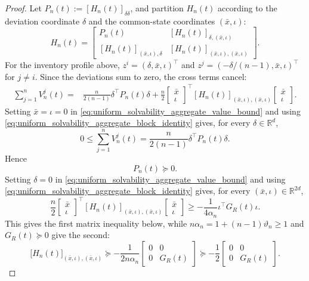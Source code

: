 \documentclass[12pt]{article}
\numberwithin{equation}{section}
\theoremstyle{definition}
\begin{document}
\begin{proof}
Let \(P_n(t):=[H_n(t)]_{\delta\delta}\), and partition \(H_n(t)\) according
to the deviation coordinate \(\delta\) and the common-state coordinates
\((\bar x,\iota)\):
\[
H_n(t)=
\begin{bmatrix}
P_n(t)&[H_n(t)]_{\delta,(\bar x,\iota)}\\
[H_n(t)]_{(\bar x,\iota),\delta}
&[H_n(t)]_{(\bar x,\iota),(\bar x,\iota)}
\end{bmatrix}.
\]
For the inventory profile above,
\(z^i=(\delta,\bar x,\iota)^\top\) and
\(z^j=(-\delta/(n-1),\bar x,\iota)^\top\) for \(j\ne i\).  Since the
deviations sum to zero, the cross terms cancel:
\begin{equation}
\label{eq:uniform_solvability_aggregate_block_identity}
\begin{aligned}
\sum_{j=1}^nV_n^j(t)
={}&\frac{n}{2(n-1)}\delta^\top P_n(t)\delta
+\frac n2
\begin{bmatrix}\bar x\\\iota\end{bmatrix}^{\!\top}
[H_n(t)]_{(\bar x,\iota),(\bar x,\iota)}
\begin{bmatrix}\bar x\\\iota\end{bmatrix}.
\end{aligned}
\end{equation}
Setting \(\bar x=\iota=0\) in
\eqref{eq:uniform_solvability_aggregate_value_bound} and using
\eqref{eq:uniform_solvability_aggregate_block_identity} gives, for every
\(\delta\in\mathbb R^d\),
\[
0\leq\sum_{j=1}^nV_n^j(t)
=\frac{n}{2(n-1)}\delta^\top P_n(t)\delta.
\]
Hence
\begin{equation}
\label{eq:uniform_solvability_deviation_block_psd}
P_n(t)\succeq0.
\end{equation}
Setting \(\delta=0\) in
\eqref{eq:uniform_solvability_aggregate_value_bound} and using
\eqref{eq:uniform_solvability_aggregate_block_identity} gives, for every
\((\bar x,\iota)\in\mathbb R^{2d}\),
\[
\frac n2
\begin{bmatrix}\bar x\\\iota\end{bmatrix}^{\!\top}
[H_n(t)]_{(\bar x,\iota),(\bar x,\iota)}
\begin{bmatrix}\bar x\\\iota\end{bmatrix}
\geq-\frac1{4\alpha_n}\iota^\top G_R(t)\iota.
\]
This gives the first matrix inequality below, while
\(n\alpha_n=1+(n-1)\vartheta_n\geq1\) and \(G_R(t)\succeq0\) give the second:
\begin{equation}\label{eq:uniform_solvability_common_block_lower_bound}
\bigl[H_n(t)\bigr]_{(\bar x,\iota),(\bar x,\iota)}
\succeq
-\frac1{2n\alpha_n}
\begin{bmatrix}0&0\\0&G_R(t)\end{bmatrix}
\succeq
-\frac12\begin{bmatrix}0&0\\0&G_R(t)\end{bmatrix}.
\end{equation}


\end{proof}
\end{document}
